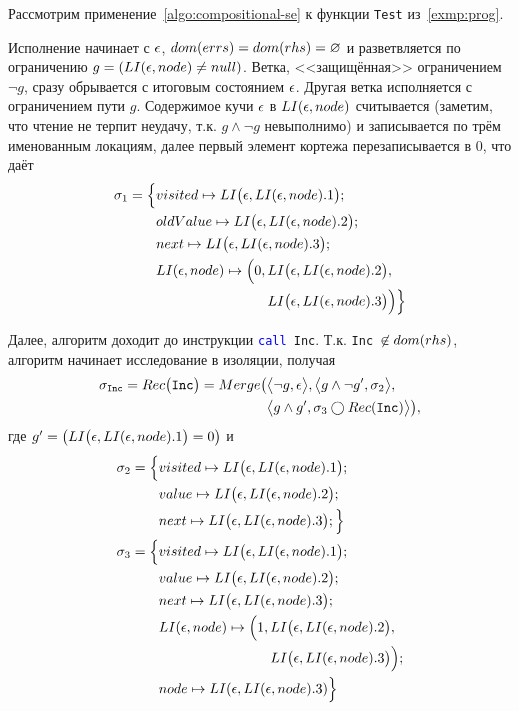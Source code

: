 \begin{exmp}\label{EXMP:HEAP-OF-PROG}
Рассмотрим применение~\autoref{algo:compositional-se} к функции \texttt{Test} из~\autoref{exmp:prog}.

Исполнение начинает с $\epsilon$, $dom(errs)=dom(rhs)=\varnothing$ и разветвляется по ограничению $g = (LI(\epsilon, node) \neq null)$. Ветка, <<защищённая>> ограничением $\neg g$, сразу обрывается с итоговым состоянием $\epsilon$. Другая ветка исполняется с ограничением пути $g$. Содержимое кучи $\epsilon$ в $LI(\epsilon, node)$ считывается (заметим, что чтение не терпит неудачу, т.к. $g\wedge \neg g$ невыполнимо) и записывается по трём именованным локациям, далее первый элемент кортежа перезаписывается в $0$, что даёт
\begin{align*}
\sigma_1 = \Big\{ &visited \mapsto LI\big(\epsilon, LI(\epsilon, node).1\big);\\&oldValue \mapsto LI\big(\epsilon, LI(\epsilon, node).2\big);\\
            & next \mapsto LI\big(\epsilon, LI(\epsilon, node).3\big);\\
			& LI(\epsilon, node)\mapsto \Big(0, LI\big(\epsilon, LI(\epsilon, node).2\big),\\ &\qquad\qquad\qquad\qquad LI\big(\epsilon, LI(\epsilon, node).3\big)\Big)\Big\}
\end{align*}

Далее, алгоритм доходит до инструкции \texttt{\textcolor{blue}{call} Inc}. Т.к. \texttt{Inc}~$\not\in dom(rhs)$, алгоритм начинает исследование  в изоляции, получая
\begin{align*}
\sigma_{\texttt{Inc}} = Rec\big(\texttt{Inc}\big) = Merge\big(&\big\langle\neg g, \epsilon\big\rangle, \big\langle g \wedge \neg g', \sigma_2\big\rangle,\\
&\big\langle g\wedge g', \sigma_3\bigcirc Rec(\texttt{Inc})\big\rangle\big),
\end{align*}
где $g' = \big(LI\big(\epsilon, LI(\epsilon, node).1\big) = 0\big)$ и
\begin{align*}
\sigma_2 = \Big\{ &visited \mapsto LI\big(\epsilon, LI(\epsilon, node).1\big);\\
&value \mapsto LI\big(\epsilon, LI(\epsilon, node).2\big);\\
&next \mapsto LI\big(\epsilon, LI(\epsilon, node).3\big);\Big\}\\
\sigma_3 = \Big\{ &visited \mapsto LI\big(\epsilon, LI(\epsilon, node).1\big);\\
&value \mapsto LI\big(\epsilon, LI(\epsilon, node).2\big);\\
&next \mapsto LI\big(\epsilon, LI(\epsilon, node).3\big);\\
			& LI(\epsilon, node)\mapsto \Big(1, LI\big(\epsilon, LI(\epsilon, node).2\big),\\
			& \qquad\qquad\qquad\qquad LI\big(\epsilon, LI(\epsilon, node).3\big)\Big);\\
&node \mapsto LI(\epsilon, LI(\epsilon, node).3)\Big\}
\end{align*}


\end{exmp}
